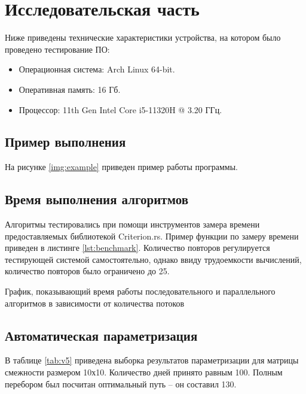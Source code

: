\chapter{Исследовательская часть}
Ниже приведены технические характеристики устройства, на котором было проведено тестирование ПО:

\begin{itemize}
    \item Операционная система: Arch Linux \cite{arch} 64-bit.
    \item Оперативная память: 16 Гб.
    \item Процессор: 11th Gen Intel\textsuperscript{\tiny\textregistered} Core\textsuperscript{\tiny\texttrademark} i5-11320H @ 3.20 ГГц\cite{i5}.
\end{itemize}

\section{Пример выполнения}
На рисунке \ref{img:example} приведен пример работы программы.
\clearpage

\section{Время выполнения алгоритмов}
Алгоритмы тестировались при помощи инструментов замера времени предоставляемых библиотекой Criterion.rs\cite{Criterion}.
Пример функции по замеру времени приведен в листинге \ref{lst:benchmark}.
Количество повторов регулируется тестирующей системой самостоятельно, однако ввиду трудоемкости вычислений, количество повторов было ограничено до 25.


\newpage
График, показывающий время работы последовательного и параллельного алгоритмов в зависимости от количества потоков\newline

 \newpage


\section{Автоматическая параметризация}

В таблице \ref{tab:v5} приведена выборка результатов параметризации для матрицы смежности размером 10х10. Количество дней принято равным 100. Полным перебором был посчитан оптимальный путь -- он составил 130.

